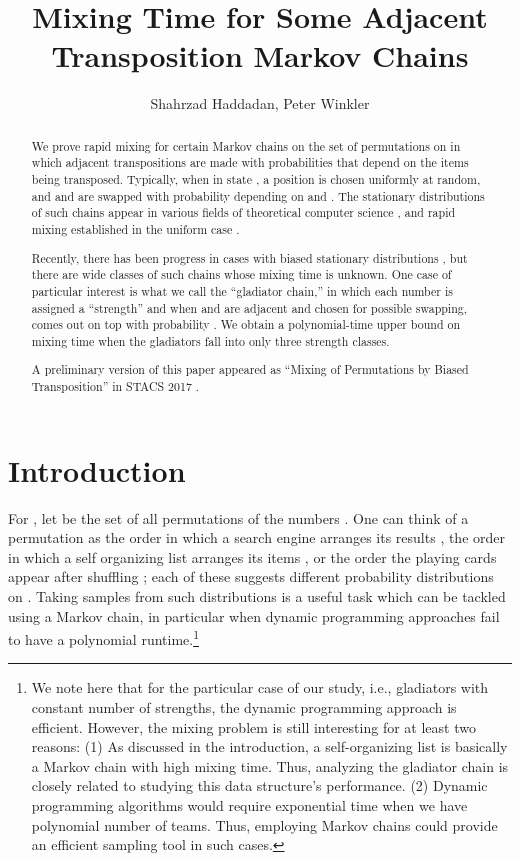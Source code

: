 \documentclass[10 pt]{article}
\date{}
\title{Mixing Time for Some Adjacent Transposition Markov Chains}
\author{Shahrzad Haddadan, Peter Winkler}
\begin{document}
\maketitle

\begin{abstract}

We prove rapid mixing for certain Markov chains on the set  of permutations on  in which adjacent transpositions
are made with probabilities that depend on the items being transposed.  Typically, when in state , a position  is chosen
uniformly at random, and  and  are swapped with probability depending on  and .
The stationary distributions of such chains appear in various fields of theoretical computer science \cite{Wilson, Self1, Mallow},
and rapid mixing established in the uniform case \cite{Wilson}.

Recently, there has been progress in cases with biased stationary distributions \cite{Benjamini, Dana}, but there are wide classes of
such chains whose mixing time is unknown.  One case of particular interest is what we call the ``gladiator chain,'' in which each number 
is assigned a ``strength''  and when  and  are adjacent and chosen for possible swapping,  comes out on top with probability
.   We obtain a polynomial-time upper bound on mixing time when the gladiators fall into only three strength classes.

A preliminary version of this paper appeared as ``Mixing of Permutations by Biased Transposition'' in STACS 2017 \cite{Stacs}.
 \end{abstract}

\section{Introduction}\label{intro}
For , let  be the set of all permutations of the numbers .  One can think of a permutation as the order
in which a search engine arranges its results \cite{Mallow}, the order in which a self organizing list arranges its items \cite{Self1,Self2},
or the order the playing cards appear after shuffling \cite{Wilson, Diaconis}; each of these suggests different probability distributions on .
Taking samples from such distributions is a useful task which can be tackled using a Markov chain, in particular when dynamic programming approaches
fail to have a polynomial runtime.\footnote{We note here that for the particular case of our study, i.e., gladiators with constant number of
strengths, the dynamic programming approach is efficient. However, the mixing problem is still interesting for at least two reasons:
(1) As discussed in the introduction, a self-organizing list is basically a Markov chain with high mixing time. Thus, analyzing the gladiator
chain is closely related to studying this data structure's performance.  (2) Dynamic programming algorithms would require exponential
time when we have polynomial number of teams. Thus, employing Markov chains could provide an efficient sampling tool in such cases.} 
\end{document}
